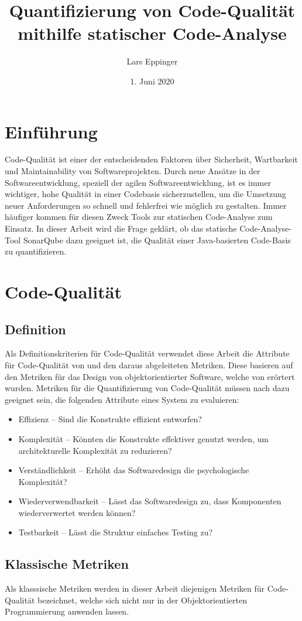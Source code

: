 \documentclass[a4paper, 12pt]{article}
\author{Lars Eppinger}
\title{Quantifizierung von Code-Qualität mithilfe statischer Code-Analyse}
\date{1. Juni 2020}
\begin{document}

\tableofcontents
\newpage

\section{Einführung}
Code-Qualität ist einer der entscheidenden Faktoren über Sicherheit, Wartbarkeit und Maintainability von Softwareprojekten. 
Durch neue Ansätze in der Softwareentwicklung, speziell der agilen Softwareentwicklung, ist es immer wichtiger, hohe Qualität in einer Codebasis sicherzustellen, um die Umsetzung neuer Anforderungen so schnell und fehlerfrei wie möglich zu gestalten.
Immer häufiger kommen für diesen Zweck Tools zur statischen Code-Analyse zum Einsatz.
In dieser Arbeit wird die Frage geklärt, ob das statische Code-Analyse-Tool SonarQube dazu geeignet ist, die Qualität einer Java-basierten Code-Basis zu quantifizieren.

\section{Code-Qualität}
\subsection{Definition}
Als Definitionskriterien für Code-Qualität verwendet diese Arbeit die Attribute für Code-Qualität von \textcite{Linda_softwarequality} und den daraus abgeleiteten Metriken.
Diese basieren auf den Metriken für das Design von objektorientierter Software, welche von \textcite{Metrics_OO_design} erörtert wurden.
Metriken für die Quantifizierung von Code-Qualität müssen nach \textcite{Linda_softwarequality} dazu geeignet sein, die folgenden Attribute eines System zu evaluieren:
\begin{itemize}
    \item Effizienz -- Sind die Konstrukte effizient entworfen?
    \item Komplexität -- Könnten die Konstrukte effektiver genutzt werden, um architekturelle Komplexität zu reduzieren?
    \item Verständlichkeit -- Erhöht das Softwaredesign die psychologische Komplexität?
    \item Wiederverwendbarkeit -- Lässt das Softwaredesign zu, dass Komponenten wiederverwertet werden können?
    \item Testbarkeit -- Lässt die Struktur einfaches Testing zu?
\end{itemize}

\subsection{Klassische Metriken}
Als klasssische Metriken werden in dieser Arbeit diejenigen Metriken für Code-Qualität bezeichnet, welche sich nicht nur in der Objektorientierten Programmierung anwenden lassen.
\end{document}
